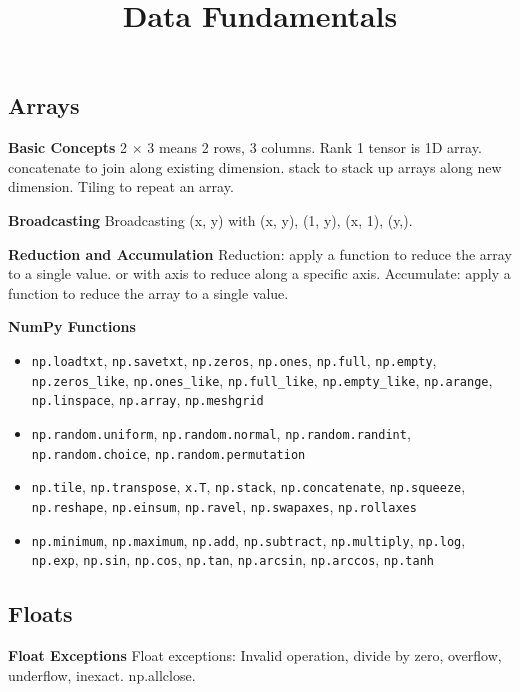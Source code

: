 \documentclass{article}
\title{Data Fundamentals}
\author{}
\date{}
\begin{document}
\small

\subsection*{Arrays}

\noindent \textbf{Basic Concepts}
2 $\times$ 3 means 2 rows, 3 columns.
Rank 1 tensor is 1D array.
concatenate to join along existing dimension.
stack to stack up arrays along new dimension.
Tiling to repeat an array.

\noindent \textbf{Broadcasting}
Broadcasting (x, y) with (x, y), (1, y), (x, 1), (y,).

\noindent \textbf{Reduction and Accumulation}
Reduction: apply a function to reduce the array to a single value.
or with axis to reduce along a specific axis.
Accumulate: apply a function to reduce the array to a single value.

\noindent \textbf{NumPy Functions}
\begin{itemize}
    \item \texttt{np.loadtxt}, \texttt{np.savetxt}, \texttt{np.zeros}, \texttt{np.ones}, \texttt{np.full}, \texttt{np.empty}, \texttt{np.zeros\_like}, \texttt{np.ones\_like}, \texttt{np.full\_like}, \texttt{np.empty\_like}, \texttt{np.arange}, \texttt{np.linspace}, \texttt{np.array}, \texttt{np.meshgrid}
    \item \texttt{np.random.uniform}, \texttt{np.random.normal}, \texttt{np.random.randint}, \texttt{np.random.choice}, \texttt{np.random.permutation}
    \item \texttt{np.tile}, \texttt{np.transpose}, \texttt{x.T}, \texttt{np.stack}, \texttt{np.concatenate}, \texttt{np.squeeze}, \texttt{np.reshape}, \texttt{np.einsum}, \texttt{np.ravel}, \texttt{np.swapaxes}, \texttt{np.rollaxes}
    \item \texttt{np.minimum}, \texttt{np.maximum}, \texttt{np.add}, \texttt{np.subtract}, \texttt{np.multiply}, \texttt{np.log}, \texttt{np.exp}, \texttt{np.sin}, \texttt{np.cos}, \texttt{np.tan}, \texttt{np.arcsin}, \texttt{np.arccos}, \texttt{np.tanh}
\end{itemize}


\subsection*{Floats}

\noindent \textbf{Float Exceptions}
Float exceptions:
Invalid operation, divide by zero, overflow, underflow, inexact.
np.allclose.
\end{document}
